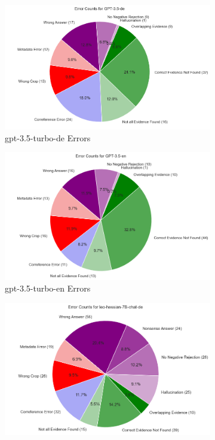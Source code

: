 \begin{figure}[h]
    \centering
    \begin{subfigure}{.5\textwidth}
        \centering
        \includegraphics[width=\linewidth]{Grafiken/Evaluation/EndToEnd/gpt-de.png}
        \caption{gpt-3.5-turbo-de Errors}
        \label{fig:gpt-de-errors}
    \end{subfigure}%
    \begin{subfigure}{.5\textwidth}
        \centering
        \includegraphics[width=\linewidth]{Grafiken/Evaluation/EndToEnd/gpt-en.png}
        \caption{gpt-3.5-turbo-en Errors}
        \label{fig:gpt-en-errors}
    \end{subfigure}
    \begin{subfigure}{.5\textwidth}
        \centering
        \includegraphics[width=\linewidth]{Grafiken/Evaluation/EndToEnd/leo.png}

\end{subfigure}
\end{figure}

